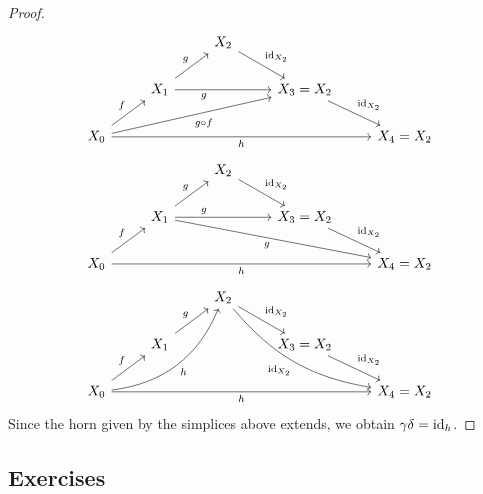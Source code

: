 \begin{proof}
\[	\begin{tikzcd}
		&& 
		X_2 
		\ar[rd, " \id_{ X_2 } "]
		\\
		&
		X_1
		\ar[rr, " g "' pos = 0.3]
		\ar[ru, "g"]
		&&
		X_3 = X_2
		\ar[rd, " \id_{X_2} "]
		\\
		X_0 
		\ar[ru, " f "]
		\ar[rrrr, " h "']
		\ar[rrru, "g \circ f"']
		&&&&
		X_4 = X_2
	\end{tikzcd}
	\]
	\[
	\begin{tikzcd}
		&& 
		X_2 
		\ar[rd, " \id_{ X_2 } "]
		\\
		&
		X_1
		\ar[rr, " g " pos = 0.3]
		\ar[ru, "g"]
		\ar[rrrd, "g "']
		&&
		X_3 = X_2
		\ar[rd, " \id_{X_2} "]
		\\
		X_0 
		\ar[ru, " f "]
		\ar[rrrr, " h "']
		&&&&
		X_4 = X_2
	\end{tikzcd}
	\]
	\[
	\begin{tikzcd}
		&& 
		X_2 
		\ar[rd, " \id_{ X_2 } "]
		\ar[rrdd, bend right = 20, " \id_{ X_2 } "']
		\\
		&
		X_1
		\ar[ru, "g"]
		&&
		X_3 = X_2
		\ar[rd, " \id_{X_2} "]
		\\
		X_0 
		\ar[rruu, bend right, "h"']
		\ar[ru, " f "]
		\ar[rrrr, " h "']
		&&&&
		X_4 = X_2
	\end{tikzcd}
	\]
	Since the horn given by the simplices above extends, we obtain $\gamma \delta = \operatorname{id}_h $. 
\end{proof}

\subsection{Exercises}

